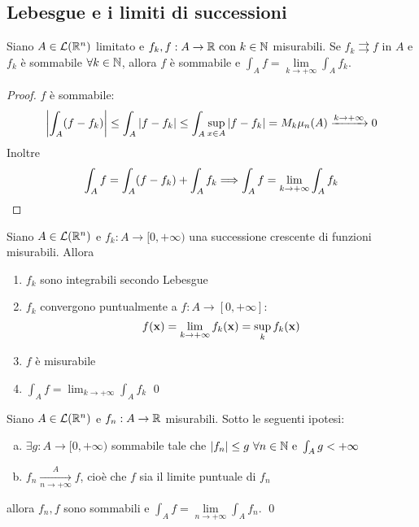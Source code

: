 \subsection{Lebesgue e i limiti di successioni}

\begin{theorem}
	Siano $A\in \mathcal{L}(\mathbb{R}^n)$ limitato e $f_k,f:A\to\mathbb{R} \text{ con } k \in \mathbb{N}$ misurabili. Se $f_k \rightrightarrows f$ in $A$ e $f_k$ è sommabile $\forall k \in \mathbb{N}$, allora $f$ è sommabile e $\int_A f = \lim\limits_{k\to+\infty}\int_Af_k$.
\end{theorem}

\begin{proof}
	$f$ è sommabile:
	$$\displaystyle\abs{\int_A (f-f_k)}\leq \int_A\abs{f-f_k}\leq \int_A\sup_{x \in A}\abs{f-f_k}=M_k\mu_n(A)\xrightarrow{k\to+\infty}0$$
	Inoltre
	$$
		\int_Af=\int_A(f-f_k)+\int_Af_k\Longrightarrow \int_Af=\lim_{k\to+\infty}\int_Af_k
	$$
\end{proof}

\begin{theorem}
	Siano $A \in \mathcal{L}(\mathbb{R}^n)$ e $f_k:A\to[0,+\infty)$ una successione crescente di funzioni misurabili. Allora
	\begin{enumerate}
		\item $f_k$ sono integrabili secondo Lebesgue
		\item $f_k$ convergono puntualmente a $f: A\to[0,+\infty]$: $$f(\vb{x})=\lim\limits_{k\to+\infty}f_k(\vb{x})=\sup_kf_k(\vb{x})$$
		\item $f$ è misurabile
		\item $\displaystyle\int_Af=\lim_{k\to+\infty}\int_Af_k$
		\qed
	\end{enumerate}
\end{theorem}

\begin{theorem}
	Siano $A\in \mathcal{L}(\mathbb{R}^n)$ e $f_n:A\to\mathbb{R}$ misurabili. Sotto le seguenti ipotesi:
	\begin{enumerate}[a.]
		\item $\exists g:A\to[0,+\infty)$ sommabile tale che $\abs{f_n}\leq g\ \forall n \in \mathbb{N} \text{ e } \int_Ag<+\infty$
		\item $f_n\xrightarrow[n\to+\infty]{A}f$, cioè che $f$ sia il limite puntuale di $f_n$
	\end{enumerate}
	allora $f_n,f$ sono sommabili e $\int_Af=\lim\limits_{n\to+\infty}\int_Af_n$.
	\qed
\end{theorem}
